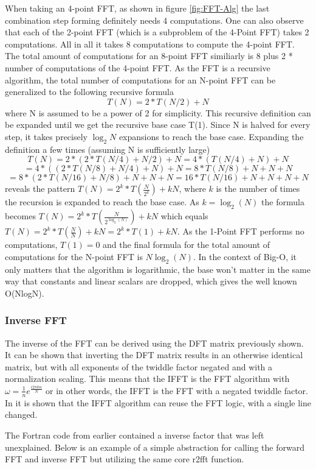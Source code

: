 When taking an 4-point FFT, as shown in figure \ref{fig:FFT-Alg} the last combination step forming definitely needs 4 computations. One can also observe that each of the 2-point FFT (which is a subproblem of the 4-Point FFT) takes 2 computations. All in all it takes 8 computations to compute the 4-point FFT. The total amount of computations for an 8-point FFT similiarly is 8 plus 2 * number of computations of the 4-point FFT. As the FFT is a recursive algorithm, the total number of computations for an N-point FFT can be generalized to the following recursive formula
$$T(N) = 2*T(N/2) + N$$
where N is assumed to be a power of 2 for simplicity. This recursive definition can be expanded
until we get the recursive base case T(1). Since N is halved for every step, it takes precisely $\log_2 N$ expansions to reach the base case. Expanding the definition a few times (assuming N is sufficiently large)
$$T(N) = 2*(2*T(N/4) + N/2) + N = 4*(T(N/4) + N) + N$$
$$= 4*((2*T(N/8)+N/4) + N) + N = 8*T(N/8) + N + N + N$$
$$= 8*(2*T(N/16) + N/8) + N + N + N = 16*T(N/16) + N + N + N + N$$
reveals the pattern $T(N) = 2^k*T(\frac{N}{2^k}) + kN$, where $k$ is the number of times the recursion is expanded to reach the base case. As $k =\log_2(N)$ the formula becomes $T(N) = 2^k*T(\frac{N}{2^{\log_2(N)}}) + kN$ which equals $T(N) = 2^k*T(\frac{N}{N}) + kN = 2^k * T(1) + kN$. As the 1-Point FFT performs no computations, $T(1) = 0$ and the final formula for the total amount of computations for the N-point FFT is $N \log_2(N)$. In the context of Big-O, it only matters that the algorithm is logarithmic, the base won't matter in the same way that constants and linear scalars are dropped, which gives the well known O(NlogN).

\subsubsection{Inverse FFT}
The inverse of the FFT can be derived using the DFT matrix previously shown. It can be shown that inverting the DFT matrix results in an otherwise identical matrix, but with all exponents of the twiddle factor negated and with a normalization scaling. This means that the IFFT is the FFT algorithm with $\omega = \frac{1}{n}e^{\frac{i2\pi kn}{N}}$ or in other words, the IFFT is the FFT with a negated twiddle factor. In \cite{Reducible2020} it is shown that the IFFT algorithm can reuse the FFT logic, with a single line changed. 

The Fortran code from earlier contained a inverse factor that was left unexplained. Below is an example of a simple abstraction for calling the forward FFT and inverse FFT but utilizing the same core r2fft function.

